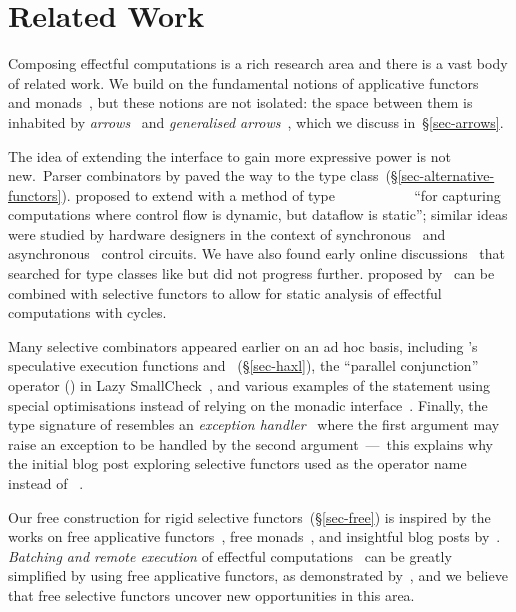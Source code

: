 \section{Related Work}\label{sec-related}

Composing effectful computations is a rich research area and there is a vast
body of related work. We build on the fundamental notions of applicative
functors~\citep{mcbride2008applicative} and
monads~\citep{moggi1991notions,1995_wadler_monads}, but these notions are not
isolated: the space between them is inhabited by
\emph{arrows}~\citep{hughes2000arrows} and \emph{generalised
arrows}~\citep{megacz2011hardware}, which we discuss in~\S\ref{sec-arrows}.

The idea of extending the  interface to gain more expressive
power is not new.~Parser combinators by \citet{swierstra1996parsers} paved the
way to the  type class~(\S\ref{sec-alternative-functors}).
\citet{yallop2010phd} proposed to extend  with a method of type
~~\hs{->}~~~\hs{->}~~~\hs{->}~~
``for capturing computations where control flow is dynamic, but dataflow is
static''; similar ideas were studied by hardware designers in the context of
synchronous~\citep{dennis1975preliminary} and
asynchronous~\citep{mokhov2009cpog,sokolov2018reconfigurable} control circuits.
We have also found early online
discussions~\citep{yorgey2009irc,permyakov2012irc} that searched for type
classes like  but did not progress further. 
proposed by~\citet{devriese2013fixing} can be combined with selective functors
to allow for static analysis of effectful computations with cycles.

Many selective combinators appeared earlier on an ad hoc basis, including
\Haxl's speculative execution functions  and
~(\S\ref{sec-haxl}), the ``parallel conjunction'' operator (\hs{*&*})
in Lazy SmallCheck~\citep{runciman2008smallcheck}, and various examples
of the  statement using special optimisations instead of relying on the
monadic interface~\citep{incremental_bind}. Finally, the type signature of
 resembles an \emph{exception handler}~\cite{benton2001exceptional}
where the first argument may raise an exception to be handled by the second
argument~---~this explains why the initial blog post exploring selective
functors used  as the operator name instead of
~\cite{mokhov2019selective}.

Our free construction for rigid selective functors~(\S\ref{sec-free}) is
inspired by the works on free applicative functors~\citep{free-applicatives},
free monads~\citep{swierstra2008data}, and insightful blog posts
by~\citet{fancher2016free,fancher2017static}. \emph{Batching and remote
execution} of effectful computations~\citep{gill2015remote} can be greatly
simplified by using free applicative functors, as
demonstrated by~\citet{gibbons2016free}, and we believe that free selective
functors uncover new opportunities in this area.

